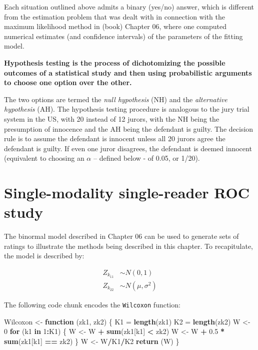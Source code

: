 \documentclass[
]{book}
\newenvironment{Shaded}{\begin{snugshade}}{\end{snugshade}}
\newcommand{\ControlFlowTok}[1]{\textcolor[rgb]{0.13,0.29,0.53}{\textbf{#1}}}
\newcommand{\DecValTok}[1]{\textcolor[rgb]{0.00,0.00,0.81}{#1}}
\newcommand{\FloatTok}[1]{\textcolor[rgb]{0.00,0.00,0.81}{#1}}
\newcommand{\KeywordTok}[1]{\textcolor[rgb]{0.13,0.29,0.53}{\textbf{#1}}}
\newcommand{\NormalTok}[1]{#1}
\newcommand{\OperatorTok}[1]{\textcolor[rgb]{0.81,0.36,0.00}{\textbf{#1}}}
\newcommand{\StringTok}[1]{\textcolor[rgb]{0.31,0.60,0.02}{#1}}
\begin{document}
Each situation outlined above admits a binary (yes/no) answer, which is different from the estimation problem that was dealt with in connection with the maximum likelihood method in (book) Chapter 06, where one computed numerical estimates (and confidence intervals) of the parameters of the fitting model.

\textbf{Hypothesis testing is the process of dichotomizing the possible outcomes of a statistical study and then using probabilistic arguments to choose one option over the other.}

The two options are termed the \emph{null hypothesis} (NH) and the \emph{alternative hypothesis} (AH). The hypothesis testing procedure is analogous to the jury trial system in the US, with 20 instead of 12 jurors, with the NH being the presumption of innocence and the AH being the defendant is guilty. The decision rule is to assume the defendant is innocent unless all 20 jurors agree the defendant is guilty. If even one juror disagrees, the defendant is deemed innocent (equivalent to choosing an \(\alpha\) -- defined below - of 0.05, or 1/20).

\hypertarget{single-modality-single-reader-roc-study}{%
\section{Single-modality single-reader ROC study}\label{single-modality-single-reader-roc-study}}

The binormal model described in Chapter 06 can be used to generate sets of ratings to illustrate the methods being described in this chapter. To recapitulate, the model is described by:

\begin{align*} 
Z_{k_11} &\sim N\left ( 0,1 \right ) \\ 
Z_{k_22} &\sim N\left ( \mu,\sigma^2 \right )
\end{align*}

The following code chunk encodes the \texttt{Wilcoxon} function:

\begin{Shaded}
\begin{Highlighting}[]
\NormalTok{Wilcoxon <-}\StringTok{ }\ControlFlowTok{function}\NormalTok{ (zk1, zk2)}
\NormalTok{\{}
\NormalTok{  K1 =}\StringTok{ }\KeywordTok{length}\NormalTok{(zk1)}
\NormalTok{  K2 =}\StringTok{ }\KeywordTok{length}\NormalTok{(zk2)}
\NormalTok{  W <-}\StringTok{ }\DecValTok{0}
  \ControlFlowTok{for}\NormalTok{ (k1 }\ControlFlowTok{in} \DecValTok{1}\OperatorTok{:}\NormalTok{K1) \{}
\NormalTok{    W <-}\StringTok{ }\NormalTok{W }\OperatorTok{+}\StringTok{ }\KeywordTok{sum}\NormalTok{(zk1[k1] }\OperatorTok{<}\StringTok{ }\NormalTok{zk2)}
\NormalTok{    W <-}\StringTok{ }\NormalTok{W }\OperatorTok{+}\StringTok{ }\FloatTok{0.5} \OperatorTok{*}\StringTok{ }\KeywordTok{sum}\NormalTok{(zk1[k1] }\OperatorTok{==}\StringTok{ }\NormalTok{zk2)}
\NormalTok{  \}}
\NormalTok{  W <-}\StringTok{ }\NormalTok{W}\OperatorTok{/}\NormalTok{K1}\OperatorTok{/}\NormalTok{K2}
  \KeywordTok{return}\NormalTok{ (W)}
\NormalTok{\}}
\end{Highlighting}
\end{Shaded}
\end{document}
